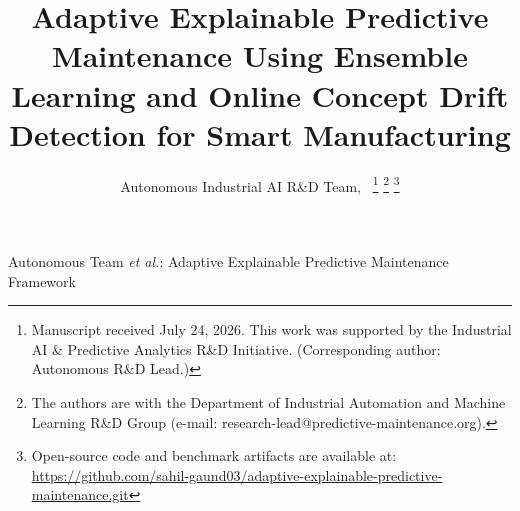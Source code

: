 \documentclass[journal]{IEEEtran}
\begin{document}
\title{Adaptive Explainable Predictive Maintenance Using Ensemble Learning and Online Concept Drift Detection for Smart Manufacturing}

\author{Autonomous Industrial AI R\&D Team,~
\thanks{Manuscript received July 24, 2026. This work was supported by the Industrial AI \& Predictive Analytics R\&D Initiative. (Corresponding author: Autonomous R\&D Lead.)}
\thanks{The authors are with the Department of Industrial Automation and Machine Learning R\&D Group (e-mail: research-lead@predictive-maintenance.org).}
\thanks{Open-source code and benchmark artifacts are available at: \url{https://github.com/sahil-gaund03/adaptive-explainable-predictive-maintenance.git}}
}

%
{Autonomous Team \MakeLowercase{\textit{et al.}}: Adaptive Explainable Predictive Maintenance Framework}

\maketitle
\end{document}
